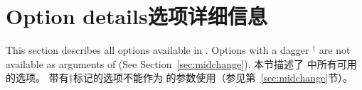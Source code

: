 \section{Option details\hfill 选项详细信息}
\begin{paracol}{2}
This section describes all options available in \Gm.
Options with a dagger $^\dagger$ are not available 
as arguments of  (See Section~\ref{sec:midchange}).
\switchcolumn
本节描述了 \Gm 中所有可用的选项。
带有†标记的选项不能作为  的参数使用（参见第~\ref{sec:midchange}节）。
\end{paracol}

%  
% 
% 
% 
%  
%  
%  
